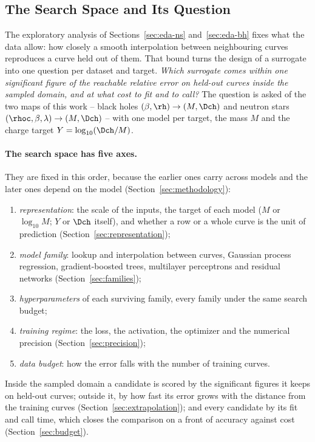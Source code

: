 \subsection{The Search Space and Its Question}
\label{sec:hypotheses}

The exploratory analysis of Sections~\ref{sec:eda-ns} and~\ref{sec:eda-bh} fixes what the data allow: how closely a smooth interpolation between neighbouring curves reproduces a curve held out of them. That bound turns the design of a surrogate into one question per dataset and target. \emph{Which surrogate comes within one significant figure of the reachable relative error on held-out curves inside the sampled domain, and at what cost to fit and to call?} The question is asked of the two maps of this work -- black holes $(\beta, \rh) \to (M, \Dch)$ and neutron stars $(\rhoc, \beta, \lambda) \to (M, \Dch)$ -- with one model per target, the mass $M$ and the charge target $Y = \log_{10}(\Dch/M)$.

\paragraph{The search space has five axes.}
They are fixed in this order, because the earlier ones carry across models and the later ones depend on the model (Section~\ref{sec:methodology}):
\begin{enumerate}
  \item \emph{representation}: the scale of the inputs, the target of each model ($M$ or $\log_{10} M$; $Y$ or $\Dch$ itself), and whether a row or a whole curve is the unit of prediction (Section~\ref{sec:representation});
  \item \emph{model family}: lookup and interpolation between curves, Gaussian process regression, gradient-boosted trees, multilayer perceptrons and residual networks (Section~\ref{sec:families});
  \item \emph{hyperparameters} of each surviving family, every family under the same search budget;
  \item \emph{training regime}: the loss, the activation, the optimizer and the numerical precision (Section~\ref{sec:precision});
  \item \emph{data budget}: how the error falls with the number of training curves.
\end{enumerate}
Inside the sampled domain a candidate is scored by the significant figures it keeps on held-out curves; outside it, by how fast its error grows with the distance from the training curves (Section~\ref{sec:extrapolation}); and every candidate by its fit and call time, which closes the comparison on a front of accuracy against cost (Section~\ref{sec:budget}).

